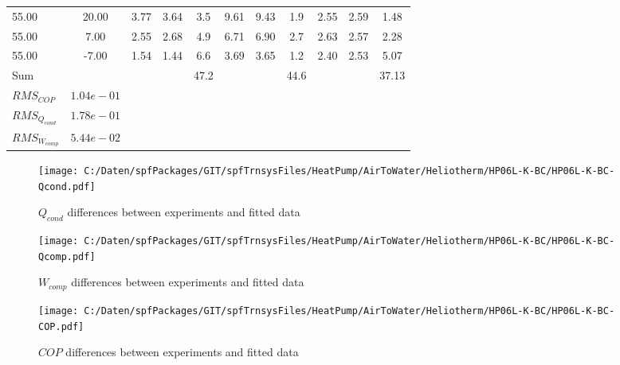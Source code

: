 \documentclass[english]{SPFShortReport}
\begin{document}
\begin{table}[!ht]
\begin{small}
\begin{center}
{\begin{tabular}{l | c c c c c c c c c c }
55.00  & 20.00 & 3.77 & 3.64 & 3.5 & 9.61 & 9.43 & 1.9 & 2.55 & 2.59 & 1.48\\ 
55.00  & 7.00 & 2.55 & 2.68 & 4.9 & 6.71 & 6.90 & 2.7 & 2.63 & 2.57 & 2.28\\ 
55.00  & -7.00 & 1.54 & 1.44 & 6.6 & 3.69 & 3.65 & 1.2 & 2.40 & 2.53 & 5.07\\ 
\hline 
 Sum &  & &  & 47.2 &  &  & 44.6 & &  & 37.13\\ 
\hline 
 $RMS_{COP}$ & $1.04e-01$ \\ 
 $RMS_{Q_{cond}}$ & $1.78e-01$ \\ 
 $RMS_{W_{comp}}$ & $5.44e-02$ \\ 
\hline
\hline
\end{tabular}
}
\label{ErrorsTable}
\end{center}
\end{small}
\end{table}
\begin{figure}[!ht]
\begin{center}
\texttt{[image: C:/Daten/spfPackages/GIT/spfTrnsysFiles/HeatPump/AirToWater/Heliotherm/HP06L-K-BC/HP06L-K-BC-Qcond.pdf]}
\caption{$Q_{cond}$ differences between experiments and fitted data}
\label{QcongFig}
\end{center}
\end{figure}
\begin{figure}[!ht]
\begin{center}
\texttt{[image: C:/Daten/spfPackages/GIT/spfTrnsysFiles/HeatPump/AirToWater/Heliotherm/HP06L-K-BC/HP06L-K-BC-Qcomp.pdf]}
\caption{$W_{comp}$ differences between experiments and fitted data}
\label{QcompFig}
\end{center}
\end{figure}
\begin{figure}[!ht]
\begin{center}
\texttt{[image: C:/Daten/spfPackages/GIT/spfTrnsysFiles/HeatPump/AirToWater/Heliotherm/HP06L-K-BC/HP06L-K-BC-COP.pdf]}
\caption{$COP$ differences between experiments and fitted data}
\label{COPFig}
\end{center}
\end{figure}
\end{document}
